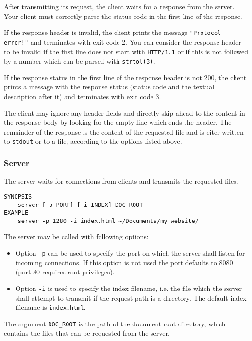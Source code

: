 After transmitting its request, the client waits for a response from the server.
Your client must correctly parse the status code
in the first line of the response.

If the response header is invalid,
the client prints the message \texttt{"Protocol error!"}
and terminates with exit code 2.
You can consider the response header to be invalid
if the first line does not start with \verb|HTTP/1.1|
or if this is not followed by a number
which can be parsed with \verb|strtol(3)|.

If the response status in the first line of the response header is not 200,
the client prints a message with the response status
(status code and the textual description after it)
and terminates with exit code 3.

The client may ignore any header fields
and directly skip ahead to the content in the response body
by looking for the empty line which ends the header.
The remainder of the response is the content of the requested file
and is eiter written to \verb|stdout| or to a file,
according to the options listed above.

\subsubsection*{Server}

The server waits for connections from clients
and transmits the requested files.

\begin{verbatim}
SYNOPSIS
    server [-p PORT] [-i INDEX] DOC_ROOT
EXAMPLE
    server -p 1280 -i index.html ~/Documents/my_website/
\end{verbatim}

The server may be called with following options:
\begin{itemize}
\item Option \texttt{-p} can be used to specify the port
on which the server shall listen for incoming connections.
If this option is not used the port defaults to 8080
(port 80 requires root privileges).
\item Option \texttt{-i} is used to specify the index filename,
i.e. the file which the server shall attempt to transmit
if the request path is a directory.
The default index filename is \verb|index.html|.
\end{itemize}

The argument \verb|DOC_ROOT| is the path of the document root directory,
which contains the files that can be requested from the server.

